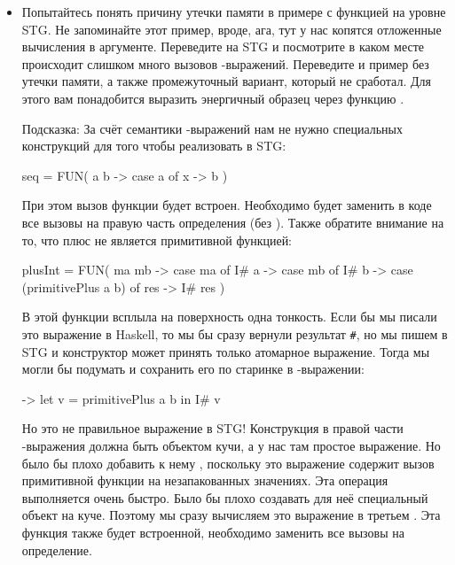 \begin{itemize}

\item Попытайтесь понять причину утечки памяти в примере с
функцией  на уровне STG. Не запоминайте этот пример,
вроде, ага, тут у нас копятся отложенные вычисления в аргументе.
Переведите на STG и посмотрите в каком месте происходит слишком
много вызовов -выражений. Переведите и пример без
утечки памяти, а также промежуточный вариант, который не сработал.
Для этого вам понадобится выразить энергичный образец через
функцию . 

Подсказка: За счёт семантики -выражений
нам не нужно специальных конструкций для
того чтобы реализовать  в STG:

\begin{code}
seq = FUN( a b ->
        case a of
            x -> b
      )
\end{code}
  
При этом вызов функции  будет встроен. Необходимо
будет заменить в коде все вызовы  на правую часть определения
(без ). Также обратите внимание на то, что плюс не
является примитивной функцией:


\begin{code}
plusInt = FUN( ma mb ->
            case ma of
                I# a -> case mb of
                            I# b -> case (primitivePlus a b) of
                                        res -> I# res
          )
\end{code}

В этой функции всплыла на поверхность одна тонкость. 
Если бы мы писали это выражение в Haskell, то мы бы сразу
вернули результат \verb!#!, но
мы пишем в STG и конструктор может принять только атомарное выражение.
Тогда мы могли бы подумать и сохранить его по старинке в 
-выражении:

\begin{code}
-> let v = primitivePlus a b
   in  I# v 
\end{code}
  
Но это не правильное выражение в STG! Конструкция в правой части
-выражения должна быть объектом кучи, а у нас там простое
выражение. Но было бы плохо добавить к нему ,
поскольку это выражение содержит вызов примитивной функции
на незапакованных значениях. Эта операция выполняется очень быстро.
Было бы плохо создавать для неё специальный объект
на куче. Поэтому мы сразу вычисляем это выражение в третьем .
Эта функция также будет встроенной, необходимо заменить все
вызовы на определение. 


\end{itemize}

